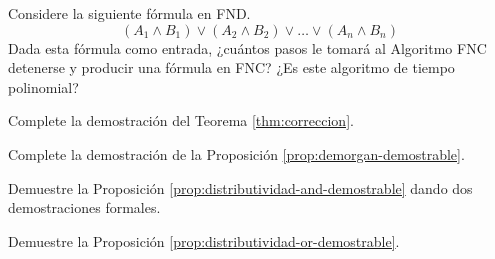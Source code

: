 \documentclass[12pt,a4paper]{book}
\begin{document}
    \begin{ejercicio}
        Considere la siguiente fórmula en FND.
        \begin{equation*}
            (A_{1}\wedge B_{1})\vee(A_{2}\wedge B_{2})\vee\dots\vee(A_{n}\wedge B_{n})
        \end{equation*}
        Dada esta fórmula como entrada, ¿cuántos pasos le tomará al Algoritmo FNC detenerse y producir una fórmula en FNC?
        ¿Es este algoritmo de tiempo polinomial?
    \end{ejercicio}

    \begin{ejercicio}\label{ej:completar-correccion}
        Complete la demostración del Teorema \ref{thm:correccion}.
    \end{ejercicio}

    \begin{ejercicio}\label{ej:completar-demorgan}
        Complete la demostración de la Proposición \ref{prop:demorgan-demostrable}.
    \end{ejercicio}

    \begin{ejercicio}\label{ej:distributividad-and-completa}
        Demuestre la Proposición \ref{prop:distributividad-and-demostrable} dando dos demostraciones formales.
    \end{ejercicio}

    \begin{ejercicio}\label{ej:distributividad-or-completa}
        Demuestre la Proposición \ref{prop:distributividad-or-demostrable}.
    \end{ejercicio}
\end{document}
